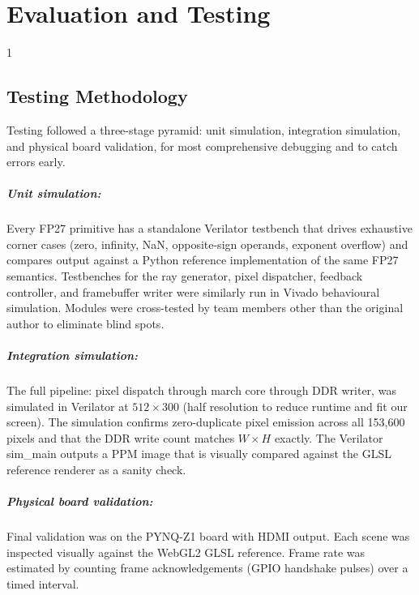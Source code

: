 \doublespacing

\chapter{Evaluation and Testing}
\label{ch3}

\begin{spacing}{1}
\minitoc
\end{spacing}
\thesisspacing

\section{Testing Methodology}

Testing followed a three-stage pyramid: unit simulation, integration
simulation, and physical board validation, for most comprehensive debugging and to catch errors early.

\paragraph{Unit simulation:}
Every FP27 primitive has a standalone Verilator testbench that drives
exhaustive corner cases (zero, infinity, NaN, opposite-sign operands,
exponent overflow) and compares output against a Python reference
implementation of the same FP27 semantics. Testbenches for the ray
generator, pixel dispatcher, feedback controller, and framebuffer writer were
similarly run in Vivado behavioural simulation. Modules were cross-tested by
team members other than the original author to eliminate blind spots.

\paragraph{Integration simulation:}
The full pipeline: pixel dispatch through march core through DDR writer,
was simulated in Verilator at $512\times300$ (half resolution to reduce
runtime and fit our screen). The simulation confirms zero-duplicate pixel emission across all
153{,}600 pixels and that the DDR write count matches $W\times H$ exactly.
The Verilator sim\_main outputs a PPM image that is visually compared against
the GLSL reference renderer as a sanity check.

\paragraph{Physical board validation:}
Final validation was on the PYNQ-Z1 board with HDMI output. Each scene was
inspected visually against the WebGL2 GLSL reference. Frame rate was
estimated by counting frame acknowledgements (GPIO handshake pulses) over a
timed interval.

